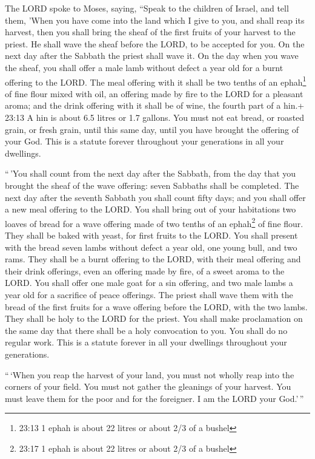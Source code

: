  The LORD spoke to Moses, saying,  ``Speak to
the children of Israel, and tell them, 'When you have come into the land
which I give to you, and shall reap its harvest, then you shall bring
the sheaf of the first fruits of your harvest to the priest.
 He shall wave the sheaf before the LORD, to be accepted
for you. On the next day after the Sabbath the priest shall wave it.
 On the day when you wave the sheaf, you shall offer a male
lamb without defect a year old for a burnt offering to the LORD.
 The meal offering with it shall be two tenths of an
ephah\footnote{23:13 1 ephah is about 22 litres or about 2/3 of a bushel}
of fine flour mixed with oil, an offering made by fire to the LORD for a
pleasant aroma; and the drink offering with it shall be of wine, the
fourth part of a hin.+ 23:13 A hin is about 6.5 litres or 1.7 gallons.
 You must not eat bread, or roasted grain, or fresh grain,
until this same day, until you have brought the offering of your God.
This is a statute forever throughout your generations in all your
dwellings.

 ``\,'You shall count from the next day after the Sabbath,
from the day that you brought the sheaf of the wave offering: seven
Sabbaths shall be completed.  The next day after the
seventh Sabbath you shall count fifty days; and you shall offer a new
meal offering to the LORD.  You shall bring out of your
habitations two loaves of bread for a wave offering made of two tenths
of an ephah\footnote{23:17 1 ephah is about 22 litres or about 2/3 of a
  bushel} of fine flour. They shall be baked with yeast, for first
fruits to the LORD.  You shall present with the bread seven
lambs without defect a year old, one young bull, and two rams. They
shall be a burnt offering to the LORD, with their meal offering and
their drink offerings, even an offering made by fire, of a sweet aroma
to the LORD.  You shall offer one male goat for a sin
offering, and two male lambs a year old for a sacrifice of peace
offerings.  The priest shall wave them with the bread of
the first fruits for a wave offering before the LORD, with the two
lambs. They shall be holy to the LORD for the priest.  You
shall make proclamation on the same day that there shall be a holy
convocation to you. You shall do no regular work. This is a statute
forever in all your dwellings throughout your generations.

 ``\,`When you reap the harvest of your land, you must not
wholly reap into the corners of your field. You must not gather the
gleanings of your harvest. You must leave them for the poor and for the
foreigner. I am the LORD your God.'\,''

